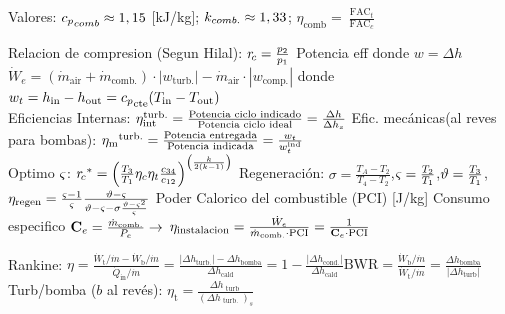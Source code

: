 \begin{formuleo}[T.Gas]
Valores: ${{c_p}}_{comb} \approx 1,15$ [kJ/kg]; $k_{comb.} \approx 1,33$; $\eta_{\mathrm{comb}} = \frac{\operatorname{FAC}_t}{\operatorname{FAC}_c}$

Relacion de compresion (Segun Hilal): ${r_{\!c}} = \frac{p_2}{p_1}$  Potencia eff donde $w=\Delta h$    \\
$\dot{W}_{e}=\left(\dot{m}_{\mathrm{air}}+\dot{m}_{\mathrm{comb.}}\right) \cdot |w_{\mathrm{turb.}}|-\dot{m}_{\mathrm{air}} \cdot |w_{\mathrm{comp.}}|$ donde $w_t = h_{\mathrm{in}}-h_{\mathrm{out}}={{c_p}}_{\mathrm{cte}} (T_{\mathrm{in}}-T_{\mathrm{out}}) $ \\
Eficiencias Internas: $\eta_{\mathrm{int}}^{\mathrm{turb.}} = \frac{\text{Potencia ciclo indicado}}{\text{Potencia ciclo ideal}} = \frac{\Delta h}{\Delta h_s}$     Efic. mecánicas(al reves para bombas): ${\eta_{\mathrm{m}}}^{\mathrm{turb.}} = \frac{\text{Potencia entregada}}{\text{Potencia indicada}} = \frac{w_t}{w^{\mathrm{ind}}_{t}} $    \\
Optimo $\varsigma$: ${r_{\!c}}^* =\left(\frac{T_{3}}{T_{1}} \eta_{c} \eta_{t} \frac{c_{34}}{c_{12}}\right)^{\left(\frac{k}{2(k-1)}\right)}$
Regeneración: $\sigma=\frac{T_A-T_2}{T_4 - T_2}$,$\varsigma = \frac{T_2}{T_1}$,$\vartheta=\frac{T_3}{T_1}$,$\eta_{\mathrm{regen}} = \frac{\varsigma  -1}{\varsigma} \frac{\vartheta-\varsigma}{\vartheta -\varsigma - \sigma \frac{\vartheta - \varsigma^2}{\varsigma}} $ 
\separar Poder Calorico del combustible (PCI) [J/kg] Consumo especifico $\mathbf{C}_e = \frac{\dot{m}_{\mathrm{comb.}}}{P_e}\rightarrow$ $\eta_{\mathrm{instalacion}} = \frac{\dot{W}_e}{\dot{m}_{\mathrm{comb.}} \cdot \mathrm{PCI}}=\frac{1}{\mathbf{C}_e \cdot\mathrm{PCI}}$   \\

\end{formuleo}


\formuleoseparator


\begin{formuleo}
Rankine: $\eta=\frac{\dot{W}_{\mathrm{t}} / \dot{m}-\dot{W}_{\mathrm{b}} / \dot{m}}{\dot{Q}_{\mathrm{in}} / \dot{m}}=\frac{\left|\Delta h_{\mathrm{turb} .}\right|-\Delta h_{\mathrm{bomba}}}{\Delta h_{\mathrm{cald}}}=1-\frac{\left|\Delta h_{\mathrm{cond} .}\right|}{\Delta h_{\mathrm{cald}}}$\separar $\mathrm{BWR}=\frac{\dot{W}_{\mathrm{b}} / \dot{m}}{\dot{W}_{\mathrm{t}} / \dot{m}}=\frac{\Delta h_{\mathrm{bomba}}}{ | \Delta h_{\mathrm{turb}} |}$ \separar Turb/bomba ($b$ al revés): $\eta_{\mathrm{t}}=\frac{\Delta h_{\text { turb }}}{\left(\Delta h_{\text { turb. }}\right)_{s}}$
\veltriangle
\end{formuleo}
\formuleoseparator


%
